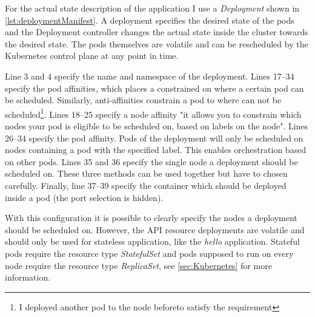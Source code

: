 For the actual state description of the application I use a \textit{Deployment} shown in \cref{lst:deploymentManifest}. A deployment specifies the desired state of the pods and the Deployment controller changes the actual state inside the cluster towards the desired state. The pods themselves are volatile and can be rescheduled by the Kubernetes control plane at any point in time. 

Line 3 and 4 specify the name and namespace of the deployment. Lines 17--34 specify the pod affinities, which places a constrained on where a certain pod can be scheduled. Similarly, anti-affinities constrain a pod to where can not be scheduled\footnote{I deployed another pod to the node beforeto satisfy the requirement}. Lines 18--25 specify a node affinity "it allows you to constrain which nodes your pod is eligible to be scheduled on, based on labels on the node"\cite{affinitiesKubernetes:online}.
Lines 26--34 specify the pod affinity. Pods of the deployment will only be scheduled on nodes containing a pod with the specified label. This enables orchestration based on other pods. Lines 35 and 36 specify the single node a deployment should be scheduled on. These three methods can be used together but have to chosen carefully. Finally, line 37--39 specify the container which should be deployed inside a pod (the port selection is hidden).

With this configuration it is possible to clearly specify the nodes a deployment should be scheduled on. However, the API resource deployments are volatile and should only be used for stateless application, like the \textit{hello} application. Stateful pods require the resource type \textit{StatefulSet} and pods supposed to run on every node require the resource type \textit{ReplicaSet}, see \cref{sec:Kubernetes} for more information.
